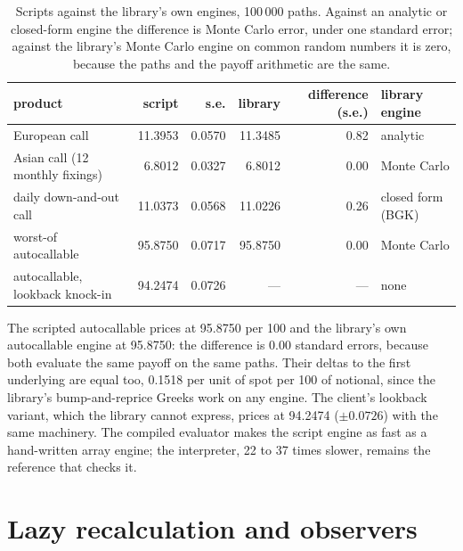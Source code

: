 \label{lst:pl:pricing-library-architecture:engine}

\begin{table}[ht]
\centering\small
\begin{tabular}{lrrrrl}
\toprule
product & script & s.e. & library & difference (s.e.) & library engine \\
\midrule
European call & 11.3953 & 0.0570 & 11.3485 & 0.82 & analytic \\
Asian call (12 monthly fixings) & 6.8012 & 0.0327 & 6.8012 & 0.00 & Monte Carlo \\
daily down-and-out call & 11.0373 & 0.0568 & 11.0226 & 0.26 & closed form (BGK) \\
worst-of autocallable & 95.8750 & 0.0717 & 95.8750 & 0.00 & Monte Carlo \\
autocallable, lookback knock-in & 94.2474 & 0.0726 & --- & --- & none \\
\bottomrule
\end{tabular}
\caption{Scripts against the library's own engines, 100\,000 paths. Against an analytic or closed-form engine the difference is Monte Carlo
error, under one standard error; against the library's Monte Carlo engine on common random numbers it is zero, because the paths and the
payoff arithmetic are the same.}\label{tab:pl:pricing-library-architecture:validation}
\end{table}

\begin{example}\label{ex:pl:pricing-library-architecture:monday}
The scripted autocallable prices at 95.8750 per 100 and the library's own autocallable engine at 95.8750: the difference is 0.00 standard
errors, because both evaluate the same payoff on the same paths. Their deltas to the first underlying are equal too, 0.1518 per unit of spot
per 100 of notional, since the library's bump-and-reprice Greeks work on any engine. The client's lookback variant, which the library cannot
express, prices at 94.2474 ($\pm0.0726$) with the same machinery. The compiled evaluator makes the script engine as fast as a hand-written
array engine; the interpreter, 22 to 37 times slower, remains the reference that checks it.
\end{example}

\section{Lazy recalculation and observers}

